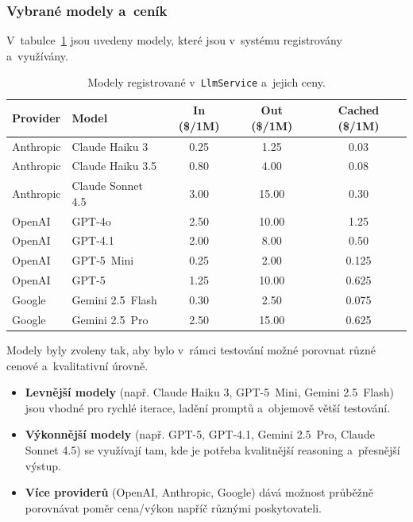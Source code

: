 \documentclass[czech, ing, kiv, he, iso690numb, viewonly]{fasthesis}
\begin{document}
\subsubsection*{Vybrané modely a~ceník}
V~tabulce~\ref{tab:impl_model_registry} jsou uvedeny modely, které jsou v~systému 
registrovány a~využívány. 

\begin{table}[H]
\centering
\small
\begin{tabularx}{\textwidth}{@{} l X c c c @{} }
\toprule
\textbf{Provider} & \textbf{Model} & \textbf{In (\$/1M)} & \textbf{Out (\$/1M)} & \textbf{Cached (\$/1M)} \\ \midrule
Anthropic & Claude Haiku 3 & 0.25 & 1.25 & 0.03 \\
Anthropic & Claude Haiku 3.5 & 0.80 & 4.00 & 0.08 \\
Anthropic & Claude Sonnet 4.5 & 3.00 & 15.00 & 0.30 \\ \midrule
OpenAI & GPT-4o & 2.50 & 10.00 & 1.25 \\
OpenAI & GPT-4.1 & 2.00 & 8.00 & 0.50 \\
OpenAI & GPT-5~Mini & 0.25 & 2.00 & 0.125 \\
OpenAI & GPT-5 & 1.25 & 10.00 & 0.625 \\ \midrule
Google & Gemini 2.5~Flash & 0.30 & 2.50 & 0.075 \\
Google & Gemini 2.5~Pro & 2.50 & 15.00 & 0.625 \\ \bottomrule
\end{tabularx}
\caption{Modely registrované v~\texttt{LlmService} a~jejich ceny.}
\label{tab:impl_model_registry}
\end{table}

Modely byly zvoleny tak, aby bylo v~rámci testování možné porovnat různé cenové a~kvalitativní úrovně.

\begin{itemize}
    \item \textbf{Levnější modely} (např. Claude Haiku 3, GPT-5~Mini, Gemini 2.5~Flash) jsou vhodné pro rychlé iterace, 
    ladění promptů a~objemově větší testování.
    \item \textbf{Výkonnější modely} (např. GPT-5, GPT-4.1, Gemini 2.5~Pro, Claude Sonnet 4.5) se využívají tam, 
    kde je potřeba kvalitnější reasoning a~přesnější výstup.
    \item \textbf{Více providerů} (OpenAI, Anthropic, Google) dává možnost průběžně porovnávat poměr cena/výkon napříč 
    různými poskytovateli.
\end{itemize}
\end{document}
